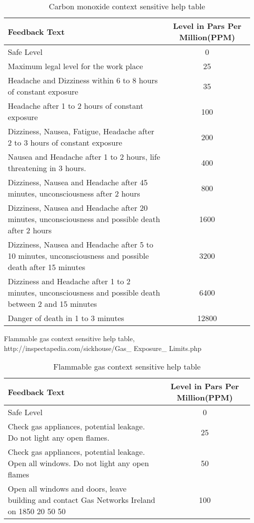 \documentclass{article}
\begin{document}
\begin{table}[H]
\def\arraystretch{2}%
\begin{center}
 \begin{tabular}{|| L{8cm} | c ||} 
 \hline
 \textbf{Feedback Text} & \textbf{Level in Pars Per Million(PPM)}  \\ [0.5ex] 
 \hline\hline
 Safe Level & 0 \\ 
 \hline
 Maximum legal level for the work place & 25 \\
 \hline
 Headache and Dizziness within 6 to 8 hours of constant exposure & 35 \\
 \hline
 Headache after 1 to 2 hours of constant exposure & 100 \\ [1ex] 
 \hline
 Dizziness, Nausea, Fatigue, Headache after 2 to 3 hours of constant exposure & 200 \\ [1ex] 
 \hline
 Nausea and Headache after 1 to 2 hours, life threatening in 3 hours. & 400 \\ [1ex] 
 \hline
 Dizziness, Nausea and Headache after 45 minutes, unconsciousness after 2 hours & 800 \\ [1ex] 
 \hline
 Dizziness, Nausea and Headache after 20 minutes, unconsciousness and possible death after 2 hours & 1600 \\ [1ex] 
 \hline
 Dizziness, Nausea and Headache after 5 to 10 minutes, unconsciousness and possible death after 15 minutes & 3200 \\ [1ex] 
 \hline
 Dizziness and Headache after 1 to 2 minutes, unconsciousness and possible death between 2 and 15 minutes & 6400 \\ [1ex] 
 \hline
 Danger of death in 1 to 3 minutes & 12800 \\ [1ex] 
 \hline
\end{tabular}
\end{center}
\caption{Carbon monoxide context sensitive help table}
\label{table:testing_op_timings}
\end{table}

\newpage
\noindent
Flammable gas context sensitive help table, http://inspectapedia.com/sickhouse/Gas\_ Exposure\_ Limits.php

\begin{table}[H]
\def\arraystretch{2}%
\begin{center}
 \begin{tabular}{|| L{8cm} | c ||} 
 \hline
 \textbf{Feedback Text} & \textbf{Level in Pars Per Million(PPM)}  \\ [0.5ex] 
 \hline\hline
 Safe Level & 0 \\ 
 \hline
 Check gas appliances, potential leakage. Do not light any open flames. & 25 \\
 \hline
 Check gas appliances, potential leakage. Open all windows. Do not light any open flames & 50 \\
 \hline
 Open all windows and doors, leave building and contact Gas Networks Ireland on 1850 20 50 50 & 100 \\ [1ex] 
 \hline
\end{tabular}
\end{center}
\caption{Flammable gas context sensitive help table}
\label{table:testing_op_timings}
\end{table}
\end{document}
